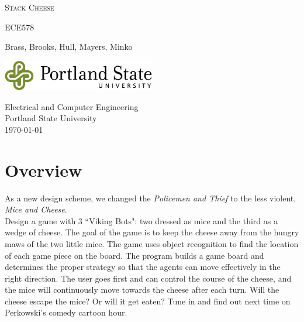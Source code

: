 \documentclass[a4paper,12pt]{article}
\newcommand{\authorname}{\footnotesize{Brass}\normalsize{, Brooks, Hull, Mayers, Minko}}
\newcommand{\classnumber}{ECE578}
\newcommand{\projectname}{Stack Cheese}
\begin{document}

\begin{titlepage}
	\begin{center}
		\vspace*{1cm}

		\huge\textsc{\projectname}

		\vspace{0.5cm}
		\small\textsc{\classnumber}
		
		\vspace{1.5cm}
		\normalsize \authorname 
		
		\vspace{0.5cm}
		
		\vfill
		\vspace{0.8cm}
		
		\includegraphics[width=0.5\textwidth]{images/psulogo_horiz_msword.tif}
		
		\vspace{0.5cm}
		Electrical and Computer Engineering\\
		Portland State University\\
		\today
		 
	\end{center}
\end{titlepage}

\newpage
\tableofcontents


\newpage
{}

\section{Overview}
	As a new design scheme, we changed the \textit{Policemen and Thief} to the less violent, \textit{Mice and Cheese}.\\

	Design a game with 3 ``Viking Bots": two dressed as mice and the third as a wedge of cheese. The goal of the game is to keep the cheese away from the hungry maws of the two little mice. The game uses object recognition to find the location of each game piece on the board. The program builds a game board and determines the proper strategy so that the agents can move effectively in the right direction. The user goes first and can control the course of the cheese, and the mice will continuously move towards the cheese after each turn. Will the cheese escape the mice? Or will it get eaten? Tune in and find out next time on Perkowski’s comedy cartoon hour.
\end{document}
